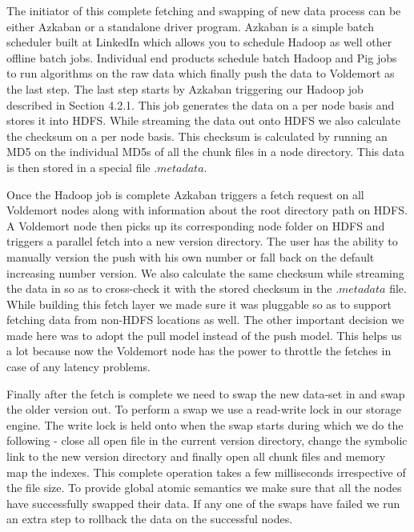 \documentclass[10pt,twocolumn,preprint,natbib,authoryear]{sigplanconf}
\begin{document}
The initiator of this complete fetching and swapping of new data process can be either Azkaban or a standalone driver program. Azkaban\cite{Azkaban} is a simple batch scheduler built at LinkedIn which allows you to schedule Hadoop as well other offline batch jobs. Individual end products schedule batch Hadoop and Pig jobs to run algorithms on the raw data which finally push the data to Voldemort as the last step. The last step starts by Azkaban triggering our Hadoop job described in Section 4.2.1. This job generates the data on a per node basis and stores it into HDFS. While streaming the data out onto HDFS we also calculate the checksum on a per node basis. This checksum is calculated by running an MD5 on the individual MD5s of all the chunk files in a node directory. This data is then stored in a special file $.metadata$. 

Once the Hadoop job is complete Azkaban triggers a fetch request on all Voldemort nodes along with information about the root directory path on HDFS. A Voldemort node then picks up its corresponding node folder on HDFS and triggers a parallel fetch into a new version directory. The user has the ability to manually version the push with his own number or fall back on the default increasing number version. We also calculate the same checksum while streaming the data in so as to cross-check it with the stored checksum in the $.metadata$ file. While building this fetch layer we made sure it was pluggable so as to support fetching data from non-HDFS locations as well. The other important decision we made here was to adopt the pull model instead of the push model. This helps us a lot because now the Voldemort node has the power to throttle the fetches in case of any latency problems. 

Finally after the fetch is complete we need to swap the new data-set in and swap the older version out. To perform a swap we use a read-write lock in our storage engine. The write lock is held onto when the swap starts during which we do the following - close all open file in the current version directory, change the symbolic link to the new version directory and finally open all chunk files and memory map the indexes. This complete operation takes a few milliseconds irrespective of the file size. To provide global atomic semantics we make sure that all the nodes have successfully swapped their data. If any one of the swaps have failed we run an extra step to rollback the data on the successful nodes. 
\end{document}
